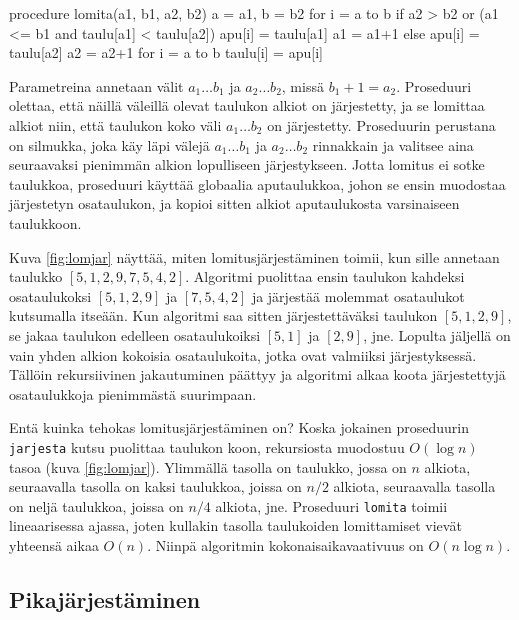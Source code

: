 \begin{code}
procedure lomita(a1, b1, a2, b2)
    a = a1, b = b2
    for i = a to b
        if a2 > b2 or (a1 <= b1 and taulu[a1] < taulu[a2])
            apu[i] = taulu[a1]
            a1 = a1+1
        else
            apu[i] = taulu[a2]
            a2 = a2+1
    for i = a to b
        taulu[i] = apu[i]
\end{code}

Parametreina annetaan välit $a_1 \dots b_1$ ja $a_2 \dots b_2$,
missä $b_1+1=a_2$.
Proseduuri olettaa, että näillä väleillä olevat 
taulukon alkiot on järjestetty,
ja se lomittaa alkiot niin, että
taulukon koko väli $a_1 \dots b_2$ on järjestetty.
Proseduurin perustana on silmukka, joka käy läpi välejä
$a_1 \dots b_1$ ja $a_2 \dots b_2$ rinnakkain ja valitsee
aina seuraavaksi pienimmän alkion lopulliseen järjestykseen.
Jotta lomitus ei sotke taulukkoa,
proseduuri käyttää globaalia aputaulukkoa,
johon se ensin muodostaa järjestetyn osataulukon,
ja kopioi sitten alkiot aputaulukosta varsinaiseen taulukkoon.

Kuva \ref{fig:lomjar} näyttää, miten lomitusjärjestäminen
toimii, kun sille annetaan taulukko $[5,1,2,9,7,5,4,2]$.
Algoritmi puolittaa ensin taulukon kahdeksi osataulukoksi
$[5,1,2,9]$ ja $[7,5,4,2]$ ja järjestää molemmat
osataulukot kutsumalla itseään.
Kun algoritmi saa sitten järjestettäväksi taulukon $[5,1,2,9]$,
se jakaa taulukon edelleen osataulukoiksi $[5,1]$ ja $[2,9]$, jne.
Lopulta jäljellä on vain yhden alkion kokoisia
osataulukoita, jotka ovat valmiiksi järjestyksessä.
Tällöin rekursiivinen jakautuminen päättyy ja algoritmi
alkaa koota järjestettyjä osataulukkoja pienimmästä suurimpaan.

Entä kuinka tehokas lomitusjärjestäminen on?
Koska jokainen proseduurin \texttt{jarjesta} kutsu
puolittaa taulukon koon, rekursiosta muodostuu
$O(\log n)$ tasoa  (kuva \ref{fig:lomjar}).
Ylimmällä tasolla on taulukko,
jossa on $n$ alkiota,
seuraavalla tasolla on kaksi taulukkoa,
joissa on $n/2$ alkiota,
seuraavalla tasolla on neljä taulukkoa,
joissa on $n/4$ alkiota, jne.
Proseduuri \texttt{lomita} toimii lineaarisessa ajassa,
joten kullakin tasolla taulukoiden lomittamiset vievät yhteensä
aikaa $O(n)$.
Niinpä algoritmin kokonaisaikavaativuus on $O(n \log n)$.

\subsection{Pikajärjestäminen}


